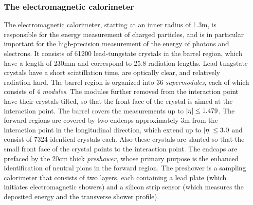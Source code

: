 \subsubsection{The electromagnetic calorimeter}
\label{sec:ecal}

The electromagnetic calorimeter, starting at an inner radius of 1.3\unit{m}, is responsible for the energy measurement of charged particles, and is in particular important for the high-precision measurement of the energy of photons and electrons.
% 
It consists of 61200 lead-tungstate crystals in the barrel region, which have a length of 230\unit{mm} and correspond to 25.8 radiation lengths.
% 
Lead-tungstate crystals have a short scintillation time, are optically clear, and relatively radiation hard.
% 
The barrel region is organized into 36 \textit{supermodules}, each of which consists of 4 \textit{modules}.
% 
The modules further removed from the interaction point have their crystals tilted, so that the front face of the crystal is aimed at the interaction point.
% 
The barrel covers the measurements up to $\left| \eta \right | \leq 1.479$.
% 
The forward regions are covered by two endcaps approximately 3\unit{m} from the interaction point in the longitudinal direction, which extend up to $\left| \eta \right | \leq 3.0$ and consist of 7324 identical crystals each.
% 
Also these crystals are slanted so that the small front face of the crystal points to the interaction point.
% 
The endcaps are prefaced by the 20\unit{cm} thick \textit{preshower}, whose primary purpose is the enhanced identification of neutral pions in the forward region.
% 
The preshower is a sampling calorimeter that consists of two layers, each containing a lead plate (which initiates electromagnetic showers) and a silicon strip sensor (which measures the deposited energy and the transverse shower profile).


